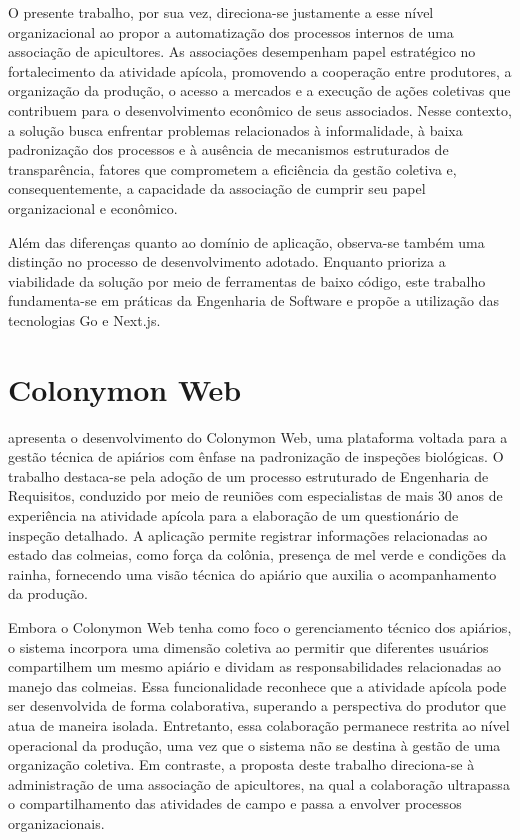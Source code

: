 O presente trabalho, por sua vez, direciona-se justamente a esse nível organizacional ao propor a automatização dos processos internos de uma associação de apicultores. As associações desempenham papel estratégico no fortalecimento da atividade apícola, promovendo a cooperação entre produtores, a organização da produção, o acesso a mercados e a execução de ações coletivas que contribuem para o desenvolvimento econômico de seus associados. Nesse contexto, a solução busca enfrentar problemas relacionados à informalidade, à baixa padronização dos processos e à ausência de mecanismos estruturados de transparência, fatores que comprometem a eficiência da gestão coletiva e, consequentemente, a capacidade da associação de cumprir seu papel organizacional e econômico.

Além das diferenças quanto ao domínio de aplicação, observa-se também uma distinção no processo de desenvolvimento adotado. Enquanto  prioriza a viabilidade da solução por meio de ferramentas de baixo código, este trabalho fundamenta-se em práticas da Engenharia de Software e propõe a utilização das tecnologias Go e Next.js.

\section{Colonymon Web}
\label{sec:colonymon}

 apresenta o desenvolvimento do Colonymon Web, uma plataforma voltada para a gestão técnica de apiários com ênfase na padronização de inspeções biológicas. O trabalho destaca-se pela adoção de um processo estruturado de Engenharia de Requisitos, conduzido por meio de reuniões com especialistas de mais 30 anos de experiência na atividade apícola para a elaboração de um questionário de inspeção detalhado. A aplicação permite registrar informações relacionadas ao estado das colmeias, como força da colônia, presença de mel verde e condições da rainha, fornecendo uma visão técnica do apiário que auxilia o acompanhamento da produção.

Embora o Colonymon Web tenha como foco o gerenciamento técnico dos apiários, o sistema incorpora uma dimensão coletiva ao permitir que diferentes usuários compartilhem um mesmo apiário e dividam as responsabilidades relacionadas ao manejo das colmeias. Essa funcionalidade reconhece que a atividade apícola pode ser desenvolvida de forma colaborativa, superando a perspectiva do produtor que atua de maneira isolada. Entretanto, essa colaboração permanece restrita ao nível operacional da produção, uma vez que o sistema não se destina à gestão de uma organização coletiva. Em contraste, a proposta deste trabalho direciona-se à administração de uma associação de apicultores, na qual a colaboração ultrapassa o compartilhamento das atividades de campo e passa a envolver processos organizacionais.

